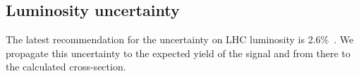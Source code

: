 \subsection{Luminosity uncertainty}
\label{sec:LumiUncertainty}
The latest recommendation for the uncertainty on LHC luminosity is 2.6$\%$~\cite{lumiPAS}.
We propagate this uncertainty to the expected yield of the signal and from there to the
calculated cross-section.
 \begin{table}[h!]
   \begin{center}
   \end{center}
   \caption{Sources of signal systematics considered in the analysis, with the corresponding magnitude.} 
   \label{tab:signalSyst}
 \end{table}
